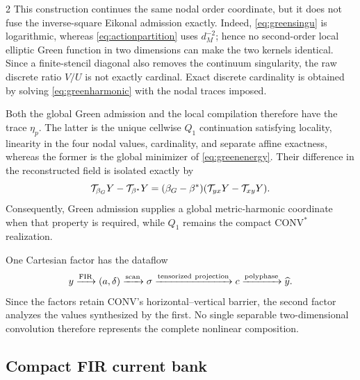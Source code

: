 \begin{multicols}{2}
This construction continues the same nodal order coordinate, but it does not
fuse the inverse-square Eikonal admission exactly. Indeed,
\eqref{eq:greensingu} is logarithmic, whereas
\eqref{eq:actionpartition} uses \(d_M^{-2}\); hence no second-order local
elliptic Green function in two dimensions can make the two kernels
identical. Since a finite-stencil diagonal also removes the continuum
singularity, the raw discrete ratio \(V/U\) is not exactly cardinal. Exact
discrete cardinality is obtained by solving \eqref{eq:greenharmonic} with the
nodal traces imposed.

Both the global Green admission and the local compilation therefore have the
trace \(\eta_p\). The latter is the unique cellwise \(Q_1\) continuation
satisfying locality, linearity in the four nodal values, cardinality, and
separate affine exactness, whereas the former is the global minimizer of
\eqref{eq:greenenergy}. Their difference in the reconstructed field is
isolated exactly by
\begin{equation}
 \mathcal{T}_{\beta_G}Y-\mathcal{T}_{\beta^*}Y
 =(\beta_G-\beta^*)(\mathcal{T}_{yx}Y-\mathcal{T}_{xy}Y).
 \label{eq:greenblenddefect}
\end{equation}
Consequently, Green admission supplies a global metric-harmonic coordinate
when that property is required, while \(Q_1\) remains the compact
CONV$^{*}$ realization.

One Cartesian factor has the dataflow
\begin{equation}
 y\xrightarrow{\rm FIR}(a,\delta)
 \xrightarrow{\rm scan}\sigma
 \xrightarrow{\rm tensorized\ projection}c
 \xrightarrow{\rm polyphase}\widehat y.
 \label{eq:starflow}
\end{equation}
Since the factors retain CONV's horizontal--vertical barrier, the second
factor analyzes the values synthesized by the first. No single separable
two-dimensional convolution therefore represents the complete nonlinear
composition.

\subsection{Compact FIR current bank}


\end{multicols}
